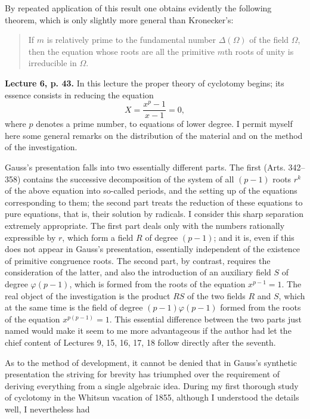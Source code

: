 \documentclass[11pt]{article}
\newcommand{\origpage}[1]{\par\vspace{0.25em}\noindent{\footnotesize\itshape [Printed page #1]}\par\vspace{0.25em}}
\begin{document}
By repeated application of this result one obtains evidently the following theorem, which is only slightly more general than Kronecker's:

\origpage{414}
\begin{quote}
If $m$ is relatively prime to the fundamental number $\Delta(\Omega)$ of the field $\Omega$, then the equation whose roots are all the primitive $m$th roots of unity is irreducible in $\Omega$.
\end{quote}

\textbf{Lecture 6, p. 43.} In this lecture the proper theory of cyclotomy begins; its essence consists in reducing the equation
\[
 X=\frac{x^p-1}{x-1}=0,
\]
where $p$ denotes a prime number, to equations of lower degree. I permit myself here some general remarks on the distribution of the material and on the method of the investigation.

Gauss's presentation falls into two essentially different parts. The first (Arts. 342--358) contains the successive decomposition of the system of all $(p-1)$ roots $r^k$ of the above equation into so-called periods, and the setting up of the equations corresponding to them; the second part treats the reduction of these equations to pure equations, that is, their solution by radicals. I consider this sharp separation extremely appropriate. The first part deals only with the numbers rationally expressible by $r$, which form a field $R$ of degree $(p-1)$; and it is, even if this does not appear in Gauss's presentation, essentially independent of the existence of primitive congruence roots. The second part, by contrast, requires the consideration of the latter, and also the introduction of an auxiliary field $S$ of degree $\varphi(p-1)$, which is formed from the roots of the equation $x^{p-1}=1$. The real object of the investigation is the product $RS$ of the two fields $R$ and $S$, which at the same time is the field of degree $(p-1)\varphi(p-1)$ formed from the roots of the equation $x^{p(p-1)}=1$. This essential difference between the two parts just named would make it seem to me more advantageous if the author had let the chief content of Lectures 9, 15, 16, 17, 18 follow directly after the seventh.

As to the method of development, it cannot be denied that in Gauss's synthetic presentation the striving for brevity has triumphed over the requirement of deriving everything from a single algebraic idea. During my first thorough study of cyclotomy in the Whitsun vacation of 1855, although I understood the details well, I nevertheless had
\end{document}
